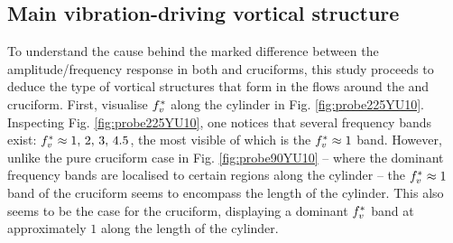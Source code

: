 \documentclass[oneside]{utmthesis}
\begin{document}
\subsection{Main vibration-driving vortical structure}\label{ssec:kvivRegimeVortStruct}

To understand the cause behind the marked difference between the amplitude/frequency response in both \angfo{} and \angth{} cruciforms, this study proceeds to deduce the type of vortical structures that form in the flows around the \angtw{} and \angon{} cruciform. First, visualise $f^{*}_{v}$ along the cylinder in Fig. \ref{fig:probe225YU10}. Inspecting Fig. \ref{fig:probe225YU10}, one notices that several frequency bands exist: $f^{*}_{v} \approx 1,\, 2,\, 3,\, 4.5$, the most visible of which is the $f^{*}_{v} \approx 1$ band. However, unlike the pure cruciform case in Fig. \ref{fig:probe90YU10} -- where the dominant frequency bands are localised to certain regions along the cylinder -- the $f^{*}_{v} \approx 1$ band of the \angtw{} cruciform seems to encompass the length of the cylinder. This also seems to be the case for the \angon{} cruciform, displaying a dominant $f^{*}_{v}$ band at approximately $1$ along the length of the cylinder.
\end{document}
